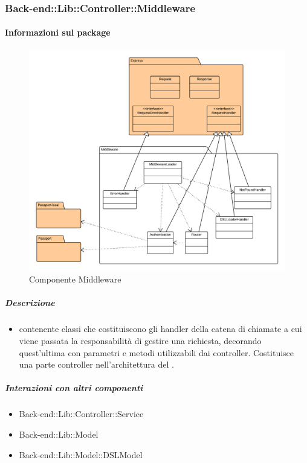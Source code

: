 	\subsubsection{Back-end::Lib::Controller::Middleware}
	\paragraph{Informazioni sul package} 
		\begin{figure}[H] 
			\begin{center} 
				\includegraphics[width=\textwidth]{uml/package/Back-end::Lib::Controller::Middleware.png}  
				\caption{Componente Middleware}
			\end{center}  
		\end{figure} 
	\subparagraph{Descrizione} 
		\begin{itemize}
		\item[]  contenente classi che costituiscono gli handler della catena di chiamate a cui viene
passata la responsabilità di gestire una richiesta, decorando quest’ultima con parametri e
metodi utilizzabili dai controller. Costituisce una parte controller nell’architettura 
del  .

		\end{itemize} 
	\subparagraph{Interazioni con altri componenti} 
		\begin{itemize} 
				\item Back-end::Lib::Controller::Service
				\item Back-end::Lib::Model
				\item Back-end::Lib::Model::DSLModel  
		\end{itemize} 
